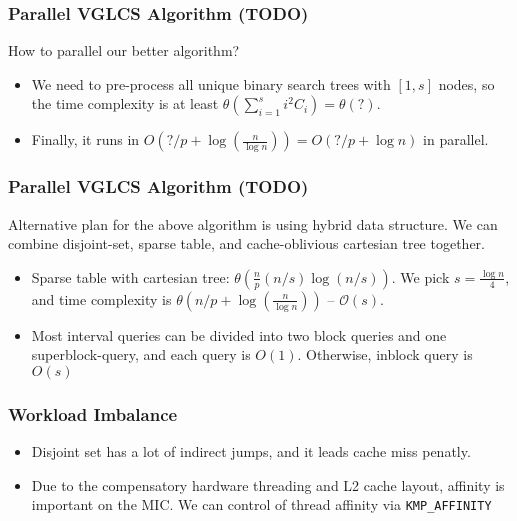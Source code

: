 \begin{frame}
	\frametitle{Parallel VGLCS Algorithm (TODO)}
	How to parallel our better algorithm?
	\begin{itemize}
		\setlength\itemsep{1em}
		\item We need to pre-process all unique binary search trees with $[1, s]$ nodes,
			so the time complexity is at least $\theta(\sum_{i = 1}^{s} i^2 C_i) =  \theta(?)$.
		\item Finally, it runs in $O(?/p + \log \left(\frac{n}{\log n}\right)) = O(?/p + \log n)$ in parallel.
	\end{itemize}
\end{frame}

\begin{frame}
	\frametitle{Parallel VGLCS Algorithm (TODO)}
	Alternative plan for the above algorithm is using hybrid data structure.
	We can combine disjoint-set, sparse table, and cache-oblivious cartesian tree together.
	\begin{itemize}
		\setlength\itemsep{1em}
		\item Sparse table with cartesian tree: $\mathcal{\theta}(\frac{n}{p} (n/s) \log (n/s))$.  
		We pick $s = \frac{\log n}{4}$, and time complexity is $\mathcal{\theta}\left(n/p + \log \left(\frac{n}{\log n}\right)\right)$ -- $\mathcal{O}(s)$.
		\item Most interval queries can be divided into two block queries
			and one superblock-query, and each query is $O(1)$. 
			Otherwise, inblock query is $O(s)$
	\end{itemize}
\end{frame}

\begin{frame}
	\frametitle{Workload Imbalance}
	\begin{itemize}
		\setlength\itemsep{1em}
		\item Disjoint set has a lot of indirect jumps, and it leads cache miss penatly.
		\item Due to the compensatory hardware threading and L2 cache layout, affinity 
			is important on the MIC. We can control of thread affinity via \tt{KMP\_AFFINITY}
	\end{itemize}
\end{frame}

